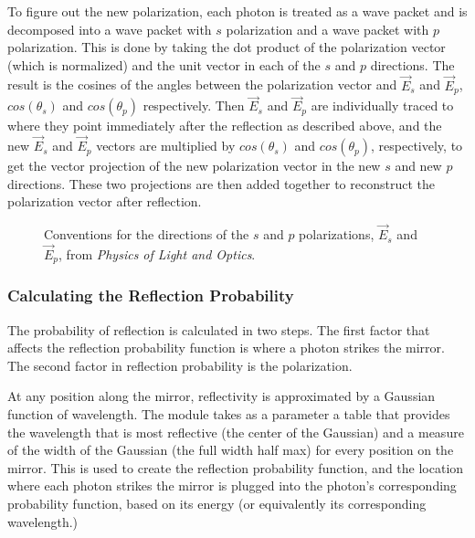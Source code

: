 \documentclass[manuscript]{aastex}
\begin{document}
To figure out the new polarization, each photon is treated as a wave packet and is decomposed into a wave packet with $s$ polarization and a wave packet with $p$ polarization. This is done by taking the dot product of the polarization vector (which is normalized) and the unit vector in each of the $s$ and $p$ directions. The result is the cosines of the angles between the polarization vector and $\vec{E}_s$ and $\vec{E}_p$, $cos(\theta_s)$ and $cos(\theta_p)$ respectively. Then $\vec{E}_s$ and $\vec{E}_p$ are individually traced to where they point immediately after the reflection as described above, and the new $\vec{E}_s$ and $\vec{E}_p$ vectors are multiplied by $cos(\theta_s)$ and $cos(\theta_p)$, respectively, to get the vector projection of the new polarization vector in the new $s$ and new $p$ directions. These two projections are then added together to reconstruct the polarization vector after reflection.

\begin{figure}[h]
\caption{Conventions for the directions of the $s$ and $p$ polarizations, $\vec{E}_s$ and $\vec{E}_p$, from \textit{Physics of Light and Optics}.\label{polarConventions}}
\end{figure}

\subsubsection{Calculating the Reflection Probability}

The probability of reflection is calculated in two steps. The first factor that affects the reflection probability function is where a photon strikes the mirror. The second factor in reflection probability is the polarization.

At any position along the mirror, reflectivity is approximated by a Gaussian function of wavelength. The module takes as a parameter a table that provides the wavelength that is most reflective (the center of the Gaussian) and a measure of the width of the Gaussian (the full width half max) for every position on the mirror. This is used to create the reflection probability function, and the location where each photon strikes the mirror is plugged into the photon's corresponding probability function, based on its energy (or equivalently its corresponding wavelength.)
\end{document}

